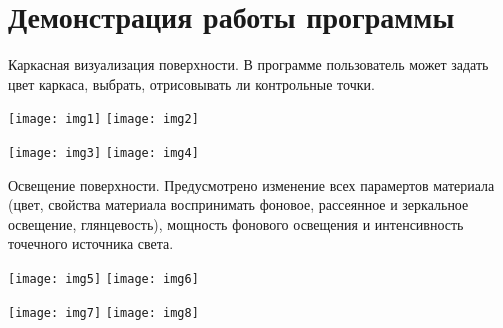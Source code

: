 \graphicspath{{png/}}

\section{Демонстрация работы программы}

Каркасная визуализация поверхности. В программе пользователь может задать цвет каркаса, выбрать, отрисовывать ли контрольные точки.

\texttt{[image: img1]}
\texttt{[image: img2]}

\texttt{[image: img3]}
\texttt{[image: img4]}
\pagebreak

Освещение поверхности. Предусмотрено изменение всех парамертов материала (цвет, свойства материала воспринимать фоновое, рассеянное и зеркальное освещение, глянцевость), мощность фонового освещения и интенсивность точечного источника света.

\texttt{[image: img5]}
\texttt{[image: img6]}

\texttt{[image: img7]}
\texttt{[image: img8]}
\pagebreak
